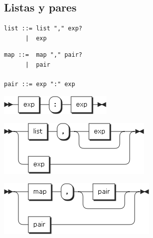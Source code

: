 \subsection {Listas y pares}
\begin{multicols}{2}
\begin{lstlisting}[style=nonumbers]      
list ::= list "," exp?
      |  exp
\end{lstlisting}  
\begin{lstlisting}[style=nonumbers]      
map ::=  map "," pair?
      |  pair
   
pair ::= exp ":" exp
\end{lstlisting}  
\begin{center}
\includegraphics[scale=0.5]{diagram/pair.png} \\
\end{center}
\columnbreak	
\begin{center}
\includegraphics[scale=0.5]{diagram/list.png} \\
\end{center}
\begin{center}
\includegraphics[scale=0.5]{diagram/map.png} \\
\end{center}
\end{multicols}

\pagebreak
